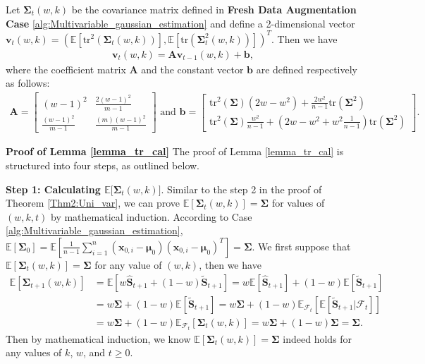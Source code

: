 \begin{lemma}
\label{lemma_tr_cal}
Let $\bm{\Sigma}_t(w,k)$ be the covariance matrix defined in \textbf{Fresh Data Augmentation Case} \ref{alg:Multivariable_gaussian_estimation} and define a 2-dimensional vector $\bm{v}_t(w,k) = \left(\mathbb{E}[\mathrm{tr}^2(\bm{\Sigma}_t(w,k))],\mathbb{E}[\mathrm{tr}(\bm{\Sigma}_t^2(w,k))]\right)^T$. Then we have
\begin{align}
\label{tr_vector_original}
\bm{v}_t(w,k) = \bm{A} \bm{v}_{t-1}(w,k) + \bm{b},
\end{align}
where the coefficient matrix $\bm{A}$ and the constant vector $\bm{b}$ are defined respectively as follows:
\begin{align*}
\bm{A} =
\begin{bmatrix}
(w - 1)^2 & \frac{2(w - 1)^2}{m - 1} \\
\frac{(w - 1)^2}{m - 1} & \frac{(m )(w - 1)^2}{m - 1}
\end{bmatrix} \mbox{ and }    \bm{b} =
\begin{bmatrix}
\mathrm{tr}^2(\bm{\Sigma})(2w-w^2)+\frac{2w^2}{n-1}\mathrm{tr}(\bm{\Sigma}^2) \\
\mathrm{tr}^2(\bm{\Sigma})\frac{w^2}{n-1}+(2w-w^2+w^2\frac{1}{n-1})\mathrm{tr}(\bm{\Sigma}^2)
\end{bmatrix}.
\end{align*}

\end{lemma}
\noindent
\textbf{Proof of Lemma \ref{lemma_tr_cal}} The proof of Lemma \ref{lemma_tr_cal} is structured into four steps, as outlined below.

\noindent
\textbf{Step 1: Calculating $\mathbb{E}\bigl[\bm{\Sigma}_t(w,k)\bigr]$}. Similar to the step 2 in the proof of Theorem \ref{Thm2:Uni_var}, we can prove $\mathbb{E}[\bm \Sigma_t(w,k)]=\bm \Sigma$ for values of $(w,k,t)$ by mathematical induction. According to Case \ref{alg:Multivariable_gaussian_estimation}, $\mathbb{E}[\bm{\Sigma}_0] = \mathbb{E}[\frac{1}{n-1}\sum_{i=1}^n (\bm{x}_{0,i}-\bm{\mu}_0)(\bm{x}_{0,i}-\bm{\mu}_0)^T]=\bm \Sigma$. We first suppose that $\mathbb{E}[\bm \Sigma_{t}(w,k)]=\bm \Sigma$ for any value of $(w,k)$, then we have
\begin{align*}
\mathbb{E}[\bm\Sigma_{t+1}(w,k)]&=\mathbb{E}[w\widehat{\bm S}_{t+1}+  (1-w) \widetilde{\bm S}_{t+1}]=w \mathbb{E}[\widehat{\bm S}_{t+1}]+(1-w)\mathbb{E}[\widetilde{\bm S}_{t+1}]\\
&=w \bm\Sigma +(1-w)\mathbb{E}[\widetilde{\bm S}_{t+1}] =w \bm\Sigma +(1-w)\mathbb{E}_{\mathcal{F}_{t}}[\mathbb{E}[\widetilde{\bm S}_{t+1}| \mathcal{F}_{t}]]\\
&=w\bm\Sigma +(1-w)\mathbb{E}_{\mathcal{F}_{t}}[\bm\Sigma_{t}(w,k) ]=w\bm\Sigma+(1-w)\bm \Sigma=\bm \Sigma.
\end{align*}
Then by mathematical induction, we know $\mathbb{E}[\bm \Sigma_t(w,k)]=\bm \Sigma$ indeed holds for any values of $k$, $w$, and $t \geq 0$.

